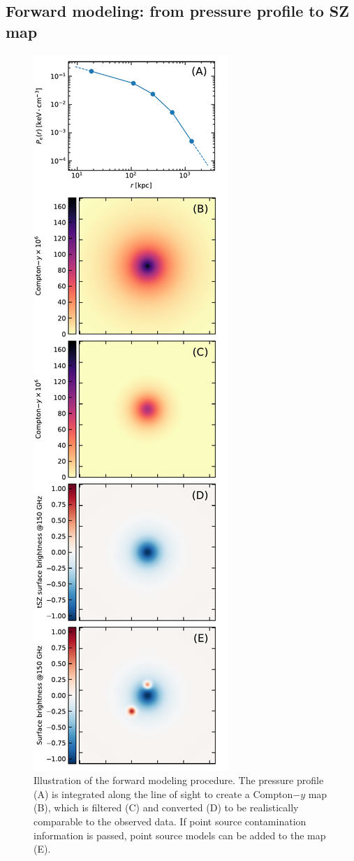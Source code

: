 \subsection{Forward modeling: from pressure profile to SZ map} \label{sec:algo:fwdmod}

\begin{figure}
    \centering
    \includegraphics[height=0.933\textheight]{Figures/fwmod.pdf}
    \caption{
        Illustration of the forward modeling procedure.
        The pressure profile (A) is integrated along the line of sight to create a Compton$-y$ map (B), which is filtered (C) and converted (D) to be realistically comparable to the observed data.
        If point source contamination information is passed, point source models can be added to the map (E).
    }
    \label{fig:fwmod}
\end{figure}

